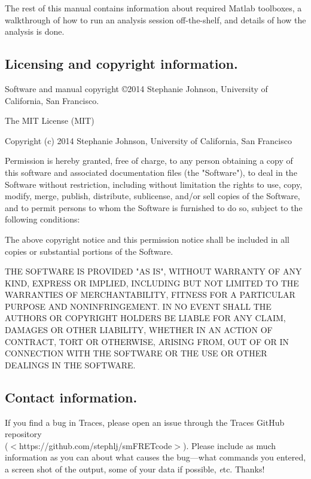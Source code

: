 \documentclass[11pt]{article}
\newcommand{\sj}[1]{\textcolor{red}{#1}}
\begin{document}
The rest of this manual contains information about required Matlab toolboxes, a walkthrough of how to run an analysis session off-the-shelf, and details of how the analysis is done.


\subsection{Licensing and copyright information.}

Software and manual copyright \copyright 2014 Stephanie Johnson, University of California, San Francisco.

 The MIT License (MIT)
 
 Copyright (c) 2014 Stephanie Johnson, University of California, San Francisco
 
 Permission is hereby granted, free of charge, to any person obtaining a copy
 of this software and associated documentation files (the "Software"), to deal
 in the Software without restriction, including without limitation the rights
 to use, copy, modify, merge, publish, distribute, sublicense, and/or sell
 copies of the Software, and to permit persons to whom the Software is
 furnished to do so, subject to the following conditions:
 
 The above copyright notice and this permission notice shall be included in all
 copies or substantial portions of the Software.
 
 THE SOFTWARE IS PROVIDED "AS IS", WITHOUT WARRANTY OF ANY KIND, EXPRESS OR
 IMPLIED, INCLUDING BUT NOT LIMITED TO THE WARRANTIES OF MERCHANTABILITY,
 FITNESS FOR A PARTICULAR PURPOSE AND NONINFRINGEMENT. IN NO EVENT SHALL THE
 AUTHORS OR COPYRIGHT HOLDERS BE LIABLE FOR ANY CLAIM, DAMAGES OR OTHER
 LIABILITY, WHETHER IN AN ACTION OF CONTRACT, TORT OR OTHERWISE, ARISING FROM,
 OUT OF OR IN CONNECTION WITH THE SOFTWARE OR THE USE OR OTHER DEALINGS IN THE
 SOFTWARE.
    
\subsection{Contact information.}

If you find a bug in Traces, please open an issue through the Traces GitHub repository \\
($<$https://github.com/stephlj/smFRETcode$>$). Please include as much information as you can about what causes the bug---what commands you entered, a screen shot of the output, some of your data if possible, {\textit etc}.  Thanks!
\end{document}
